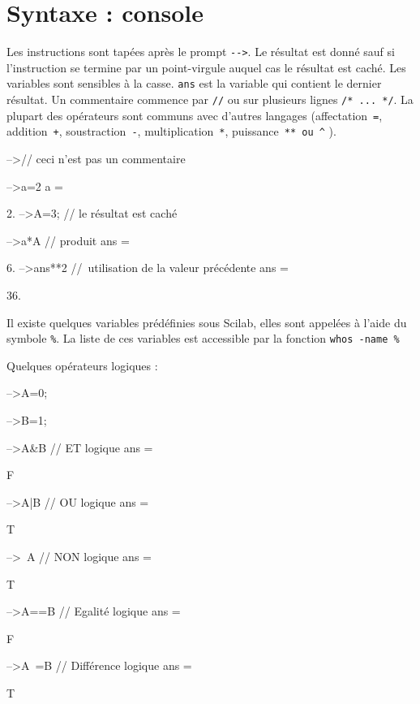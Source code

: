 \section{Syntaxe : console}
Les instructions sont tapées après le prompt \verb?-->?. Le résultat est donné 
sauf si l'instruction se termine par un point-virgule auquel cas le résultat 
est caché. Les variables sont sensibles à la casse. \verb?ans? est la variable 
qui contient le dernier résultat. Un commentaire commence par  \verb?//? ou 
sur plusieurs lignes \verb?/* ... */?. La plupart des opérateurs sont 
communs avec d'autres langages (affectation~\verb?=?, addition~\verb?+?, 
soustraction~\verb?-?, multiplication~\verb?*?, puissance~\verb?** ou ^? ).
\begin{Scilabcode}
-->// ceci n'est pas un commentaire

-->a=2
 a  =
      
    2. 
-->A=3;   // le résultat est caché

-->a*A    // produit
 ans  =

    6.  
-->ans**2 // utilisation de la valeur précédente
 ans  =
  
    36.  
\end{Scilabcode}
Il existe quelques variables prédéfinies sous Scilab, elles sont appelées à 
l'aide du symbole \og\verb?%?\fg. La liste de ces variables est accessible 
par la fonction \verb?whos -name %?
\begin{Scilabcode}
\end{Scilabcode}
Quelques opérateurs logiques : 
\begin{Scilabcode}
-->A=0;

-->B=1;

-->A&B    // ET logique
 ans  =
 
  F 

-->A|B    // OU logique
 ans  =
 
  T 

-->~A     // NON logique
 ans  =
 
  T 

-->A==B   // Egalité logique
 ans  =
 
  F

-->A~=B   // Différence logique
 ans  =
 
  T
\end{Scilabcode}
